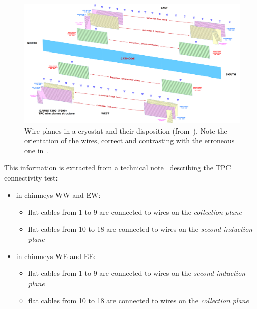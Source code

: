 \begin{figure}[p]
  \centerline{\includegraphics[width=0.8\textheight,angle=90]{figures/Icarus_TPC_wp}}
  \caption{
    Wire planes in a cryostat and their disposition (from~\cite{SBNDocDBxxxx:ConnTest}).
    Note the orientation of the wires, correct and contrasting with the erroneous one in~\cite{SBNDocDB1020}.
    \label{fig:WirePlanesInTPC}
  }
\end{figure}

This information is extracted from a technical note~\cite{SBNDocDBxxxx:ConnTest} describing the TPC connectivity test:
\begin{itemize}
  \item in chimneys WW and EW:
    \begin{itemize}
      \item flat cables from 1 to 9 are connected to wires on the \emph{collection plane}
      \item flat cables from 10 to 18 are connected to wires on the \emph{second induction plane}
    \end{itemize}
  \item in chimneys WE and EE:
    \begin{itemize}
      \item flat cables from 1 to 9 are connected to wires on the \emph{second induction plane}
      \item flat cables from 10 to 18 are connected to wires on the \emph{collection plane}
    \end{itemize}
\end{itemize}


